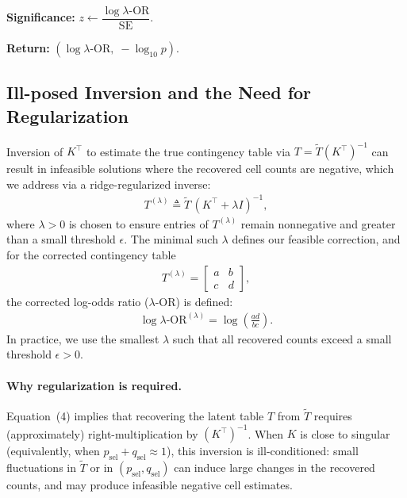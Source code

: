 \documentclass[pdflatex,sn-mathphys-num]{sn-jnl}%
\def\EQSP{3pt}
\newcommand{\cgather}[2][\EQSP]{\begingroup\setlength\abovedisplayskip{#1}\setlength\belowdisplayskip{#1}\begin{gather} #2 \end{gather}\endgroup\noindent}
\newcommand{\SPOR}{\textrm{$\lambda$-OR}}
\newcommand{\logor}{\log\SPOR}
\theoremstyle{thmstyleone}%
\theoremstyle{thmstyletwo}%
\theoremstyle{thmstylethree}%
\begin{document}
\begin{algorithm}[t]
\BlankLine
\textbf{Significance:}\;
$z \leftarrow \dfrac{\logor}{\text{SE}}$.\;

\BlankLine
\textbf{Return:}\;
\Return $(\logor,\;-\log_{10}p)$.\;

\end{algorithm}
 


\subsection{Ill-posed Inversion and the Need for Regularization}
Inversion of $K^\top$ to estimate the true contingency table via $T = \tilde{T} (K^\top)^{-1}$ can result in infeasible solutions where the recovered cell counts are negative, which we address via  a ridge-regularized inverse:
\cgather{
T^{(\lambda)} \triangleq \tilde{T} \,(K^\top + \lambda I)^{-1},
}
where $\lambda > 0$ is chosen to ensure entries of $T^{(\lambda)}$ remain nonnegative and greater than a small threshold $\epsilon$. The minimal such $\lambda$ defines our feasible correction, and for the corrected contingency table
\cgather{
T^{(\lambda)} = \begin{bmatrix}
a & b \\
c & d
\end{bmatrix},
}
the corrected log-odds ratio ($\SPOR$) is defined:
\cgather{
\logor^{(\lambda)} = \log\!\left( \frac{a d}{b c} \right).
}
In practice, we use the smallest $\lambda$ such that all recovered counts exceed a small threshold $\epsilon > 0$.

\paragraph{Why regularization is required.}
Equation~(4) implies that recovering the latent table $T$ from $\tilde T$ requires (approximately) right-multiplication by $(K^\top)^{-1}$. When $K$ is close to singular (equivalently, when $p_{\mathrm{sel}}+q_{\mathrm{sel}}\approx 1$), this inversion is ill-conditioned: small fluctuations in $\tilde T$ or in $(p_{\mathrm{sel}},q_{\mathrm{sel}})$ can induce large changes in the recovered counts, and may produce infeasible negative cell estimates.
\end{document}
